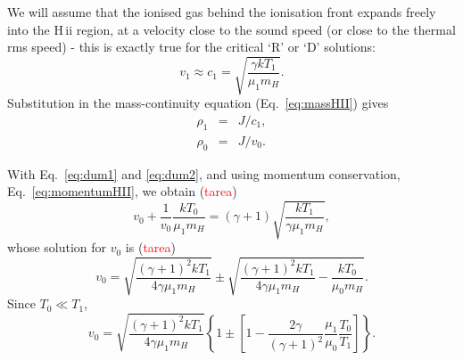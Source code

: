 \begin{frame}{}


We will assume that the ionised gas behind the ionisation front
expands freely into the H\,{\sc ii} region, at a velocity close to the
sound speed (or close to the thermal rms speed) - this is exactly true
for the critical `R' or `D' solutions:
\[
v_1 \approx c_1 = \sqrt{ \frac{ \gamma k T_1  }{\mu_1 m_H}}.
\]
Substitution in the mass-continuity equation (Eq.~\ref{eq:massHII})
gives
\begin{eqnarray}
\rho_1 &  =  & J / c_1, \label{eq:dum1} \\
\rho_0  &  =  & J / v_0. \label{eq:dum2}
\end{eqnarray}


\end{frame}





\begin{frame}{}



With Eq.~\ref{eq:dum1} and \ref{eq:dum2}, and using momentum
conservation, Eq.~\ref{eq:momentumHII}, we obtain
(\textcolor{red}{tarea}) 
\begin{equation}
v_0 + \frac{1}{v_0} \frac{k T_0}{\mu_1 m_H} = (\gamma + 1) \sqrt{ \frac{k
  T_1}{\gamma \mu_1 m_H} },
\end{equation}
whose solution for $v_0$ is (\textcolor{red}{tarea}) 
\begin{equation}
v_0 = \sqrt{ \frac{ (\gamma + 1)^2 k T_1   }{ 4 \gamma \mu_1 m_H  }  }
\pm \sqrt{  \frac{ (\gamma + 1)^2 k T_1 }{ 4 \gamma \mu_1 m_H}  -
  \frac{ k T_0 }{\mu_0 m_H} }.
\end{equation}
Since $T_0 \ll T_1$, 
\begin{equation}
v_0 = \sqrt{ \frac{ (\gamma + 1)^2 k T_1   }{ 4 \gamma \mu_1 m_H  }  }
\left\{   1 \pm  \left[ 1 -  \frac{ 2 \gamma}{ (\gamma + 1)^2 }
    \frac{\mu_1}{\mu_0} \frac{T_0}{T_1}  \right] \right\}. \label{eq:v0}
\end{equation}


\end{frame}






